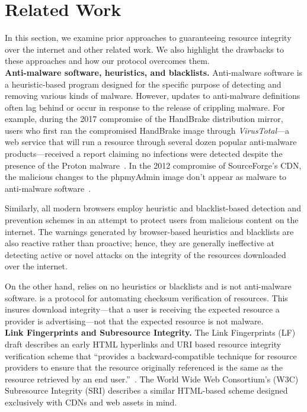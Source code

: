 \section{Related Work} \label{sec:related}

In this section, we examine prior approaches to guaranteeing resource integrity
over the internet and other related work. We also highlight the drawbacks to
these approaches and how our protocol overcomes them. \\

\noindent\textbf{Anti-malware software, heuristics, and blacklists.}
Anti-malware software is a heuristic-based program designed for the specific
purpose of detecting and removing various kinds of malware. However, updates to
anti-malware definitions often lag behind or occur in response to the release of
crippling malware. For example, during the 2017 compromise of the HandBrake
distribution mirror, users who first ran the compromised HandBrake image through
\textit{VirusTotal}---a web service that will run a resource through several
dozen popular anti-malware products---received a report claiming no infections
were detected despite the presence of the Proton malware~\cite{SCA-HB1}. In the
2012 compromise of SourceForge's CDN, the malicious changes to the phpmyAdmin
image don't appear as malware to anti-malware software~\cite{SCA-PMA1}.

Similarly, all modern browsers employ heuristic and blacklist-based detection
and prevention schemes in an attempt to protect users from malicious content on
the internet. The warnings generated by browser-based heuristics and blacklists
are also reactive rather than proactive; hence, they are generally ineffective
at detecting active or novel attacks on the integrity of the resources
downloaded over the internet.

On the other hand, \SYSTEM{} relies on no heuristics or blacklists and is not
anti-malware software. \SYSTEM{} is a protocol for automating checksum
verification of resources. This insures download integrity---that a user is
receiving the expected resource a provider is advertising---not that the
expected resource is not malware. \\

\noindent\textbf{Link Fingerprints and Subresource Integrity.} The Link
Fingerprints (LF) draft describes an early HTML hyperlinks and URI based
resource integrity verification scheme that ``provides a backward-compatible
technique for resource providers to ensure that the resource originally
referenced is the same as the resource retrieved by an end user.''~\cite{LF}.
The World Wide Web Consortium's (W3C) Subresource Integrity (SRI) describes a
similar HTML-based scheme designed exclusively with CDNs and web assets in mind.

